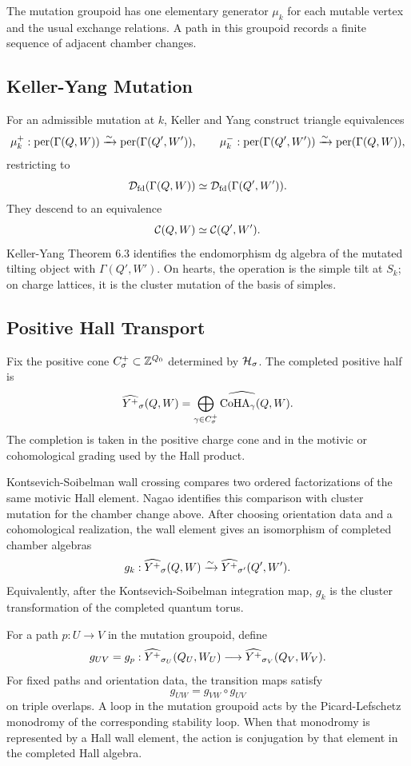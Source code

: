 The mutation groupoid has one elementary generator $\mu_k$ for each
mutable vertex and the usual exchange relations.  A path in this
groupoid records a finite sequence of adjacent chamber changes.

\subsection*{Keller-Yang Mutation}

For an admissible mutation at $k$, Keller and Yang construct triangle
equivalences
\[
  \mu_k^{+}:\mathrm{per}(\Gamma(Q,W))\xrightarrow{\sim}\mathrm{per}(\Gamma(Q',W')),
  \qquad
  \mu_k^{-}:\mathrm{per}(\Gamma(Q',W'))\xrightarrow{\sim}\mathrm{per}(\Gamma(Q,W)),
\]
restricting to
\[
  \mathcal{D}_{\mathrm{fd}}(\Gamma(Q,W))\simeq\mathcal{D}_{\mathrm{fd}}(\Gamma(Q',W')).
\]
They descend to an equivalence
\[
  \mathcal{C}(Q,W)\simeq\mathcal{C}(Q',W').
\]
Keller-Yang Theorem 6.3 identifies the endomorphism dg algebra of the
mutated tilting object with $\Gamma(Q',W')$.  On hearts, the operation
is the simple tilt at $S_k$; on charge lattices, it is the cluster
mutation of the basis of simples.

\subsection*{Positive Hall Transport}

Fix the positive cone $C_\sigma^+\subset\mathbb{Z}^{Q_0}$ determined by
$\mathcal{H}_\sigma$.  The completed positive half is
\[
  \widehat{Y^{+}}_{\sigma}(Q,W)
  =
  \widehat{\bigoplus_{\gamma\in C_\sigma^+}
  \mathrm{CoHA}_{\gamma}(Q,W)}.
\]
The completion is taken in the positive charge cone and in the
motivic or cohomological grading used by the Hall product.

Kontsevich-Soibelman wall crossing compares two ordered factorizations
of the same motivic Hall element.  Nagao identifies this comparison
with cluster mutation for the chamber change above.  After choosing
orientation data and a cohomological realization, the wall element
gives an isomorphism of completed chamber algebras
\[
  g_k:
  \widehat{Y^{+}}_{\sigma}(Q,W)
  \xrightarrow{\sim}
  \widehat{Y^{+}}_{\sigma'}(Q',W').
\]
Equivalently, after the Kontsevich-Soibelman integration map, $g_k$ is
the cluster transformation of the completed quantum torus.

For a path $p:U\to V$ in the mutation groupoid, define
\[
  g_{UV}=g_p:
  \widehat{Y^{+}}_{\sigma_U}(Q_U,W_U)
  \longrightarrow
  \widehat{Y^{+}}_{\sigma_V}(Q_V,W_V).
\]
For fixed paths and orientation data, the transition maps satisfy
\[
  g_{UW}=g_{VW}\circ g_{UV}
\]
on triple overlaps.  A loop in the mutation groupoid acts by the
Picard-Lefschetz monodromy of the corresponding stability loop.  When
that monodromy is represented by a Hall wall element, the action is
conjugation by that element in the completed Hall algebra.

